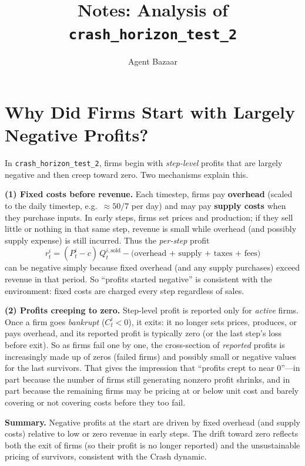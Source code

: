 \documentclass{article}
\title{Notes: Analysis of \texttt{crash\_horizon\_test\_2}}
\author{Agent Bazaar}
\date{}
\begin{document}
\maketitle

\section{Why Did Firms Start with Largely Negative Profits?}

In \texttt{crash\_horizon\_test\_2}, firms begin with \emph{step-level} profits that are largely negative and then creep toward zero. Two mechanisms explain this.

\textbf{(1) Fixed costs before revenue.} Each timestep, firms pay \textbf{overhead} (scaled to the daily timestep, e.g.\ \(\approx 50/7\) per day) and may pay \textbf{supply costs} when they purchase inputs. In early steps, firms set prices and production; if they sell little or nothing in that same step, revenue is small while overhead (and possibly supply expense) is still incurred. Thus the \emph{per-step} profit
\[
r_t^i = (P_t^i - c)\, Q_t^{i,\text{sold}} - \text{(overhead + supply + taxes + fees)}
\]
can be negative simply because fixed overhead (and any supply purchases) exceed revenue in that period. So ``profits started negative'' is consistent with the environment: fixed costs are charged every step regardless of sales.

\textbf{(2) Profits creeping to zero.} Step-level profit is reported only for \emph{active} firms. Once a firm goes \emph{bankrupt} (\(C_t^i < 0\)), it exits: it no longer sets prices, produces, or pays overhead, and its reported profit is typically zero (or the last step’s loss before exit). So as firms fail one by one, the cross-section of \emph{reported} profits is increasingly made up of zeros (failed firms) and possibly small or negative values for the last survivors. That gives the impression that ``profits crept to near 0''---in part because the number of firms still generating nonzero profit shrinks, and in part because the remaining firms may be pricing at or below unit cost and barely covering or not covering costs before they too fail.

\textbf{Summary.} Negative profits at the start are driven by fixed overhead (and supply costs) relative to low or zero revenue in early steps. The drift toward zero reflects both the exit of firms (so their profit is no longer reported) and the unsustainable pricing of survivors, consistent with the Crash dynamic.
\end{document}
